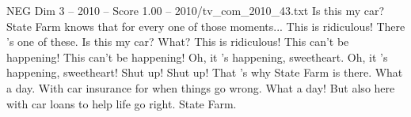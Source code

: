 \begin{textsample}{NEG Dim 3 – 2010 – Score 1.00 – 2010/tv\_com\_2010\_43.txt}  \label{ex:f3_neg_057}
Is this my car?
State Farm knows that for every one of those moments...
This is ridiculous!
There 's one of these.
Is this my car?
What?
This is ridiculous!
This can't be happening!
This can't be happening!
Oh, it 's happening, sweetheart.
Oh, it 's happening, sweetheart!
Shut up!
Shut up!
That 's why State Farm is there.
What a day.
With car insurance for when things go wrong.
What a day!
But also here with car loans to help life go right.
State Farm.

\end{textsample}
